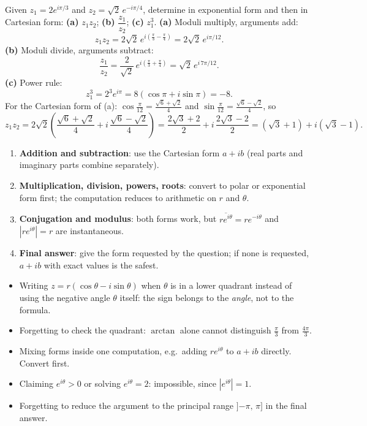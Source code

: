 \documentclass[11pt]{article}
\begin{document}
\begin{exoresolu}
Given $z_1 = 2e^{i\pi/3}$ and $z_2 = \sqrt{2}\,e^{-i\pi/4}$, determine in exponential form and then in Cartesian form: \textbf{(a)} $z_1 z_2$; \textbf{(b)} $\dfrac{z_1}{z_2}$; \textbf{(c)} $z_1^{3}$.
\tcblower
\textbf{(a)} Moduli multiply, arguments add:
\[
z_1 z_2 = 2\sqrt{2}\,e^{i\left(\frac{\pi}{3}-\frac{\pi}{4}\right)} = 2\sqrt{2}\,e^{i\pi/12}.
\]
\textbf{(b)} Moduli divide, arguments subtract:
\[
\frac{z_1}{z_2} = \frac{2}{\sqrt2}\,e^{i\left(\frac{\pi}{3}+\frac{\pi}{4}\right)} = \sqrt{2}\,e^{i\,7\pi/12}.
\]
\textbf{(c)} Power rule:
\[
z_1^{3} = 2^{3}e^{i\pi} = 8(\cos\pi + i\sin\pi) = -8.
\]
For the Cartesian form of (a): $\cos\frac{\pi}{12} = \frac{\sqrt6+\sqrt2}{4}$ and $\sin\frac{\pi}{12} = \frac{\sqrt6-\sqrt2}{4}$, so
\[
z_1z_2 = 2\sqrt2\left(\frac{\sqrt6+\sqrt2}{4} + i\,\frac{\sqrt6-\sqrt2}{4}\right) = \frac{2\sqrt3+2}{2} + i\,\frac{2\sqrt3-2}{2} = (\sqrt3+1) + i(\sqrt3-1).
\]
\end{exoresolu}

\begin{methode}
\begin{enumerate}
\item \textbf{Addition and subtraction}: use the Cartesian form $a+ib$ (real parts and imaginary parts combine separately).
\item \textbf{Multiplication, division, powers, roots}: convert to polar or exponential form first; the computation reduces to arithmetic on $r$ and $\theta$.
\item \textbf{Conjugation and modulus}: both forms work, but $\overline{re^{i\theta}} = re^{-i\theta}$ and $|re^{i\theta}| = r$ are instantaneous.
\item \textbf{Final answer}: give the form requested by the question; if none is requested, $a+ib$ with exact values is the safest.
\end{enumerate}
\end{methode}

\begin{attention}
\begin{itemize}
\item Writing $z = r(\cos\theta - i\sin\theta)$ when $\theta$ is in a lower quadrant instead of using the negative angle $\theta$ itself: the sign belongs to the \emph{angle}, not to the formula.
\item Forgetting to check the quadrant: $\arctan$ alone cannot distinguish $\frac{\pi}{3}$ from $\frac{4\pi}{3}$.
\item Mixing forms inside one computation, e.g.\ adding $re^{i\theta}$ to $a+ib$ directly. Convert first.
\item Claiming $e^{i\theta} > 0$ or solving $e^{i\theta} = 2$: impossible, since $|e^{i\theta}| = 1$.
\item Forgetting to reduce the argument to the principal range ${]{-\pi},\,\pi]}$ in the final answer.
\end{itemize}
\end{attention}
\end{document}
